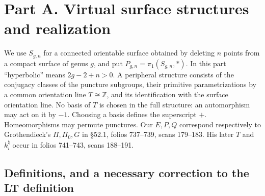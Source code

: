 \section{Part A. Virtual surface structures and realization}

We use $S_{g,n}$ for a connected orientable surface obtained by deleting $n$
points from a compact surface of genus $g$, and put
$P_{g,n}=\pi_1(S_{g,n},*)$. In this part ``hyperbolic'' means
$2g-2+n>0$. A peripheral structure consists of the conjugacy classes of the
puncture subgroups, their primitive parametrizations by a common orientation
line $T\cong\mathbb Z$, and its identification with the surface orientation
line. No basis of $T$ is chosen in the full structure: an automorphism
may act on it by $-1$. Choosing a basis defines the superscript $+$.
Homeomorphisms may permute punctures. Our $E,P,Q$
correspond respectively to Grothendieck's $\Pi,\Pi_0,G$ in \S52.1,
folios 737--739, scans 179--183. His later $T$ and $k_i^\natural$ occur in
folios 741--743, scans 188--191.

\subsection{Definitions, and a necessary correction to the LT definition}

